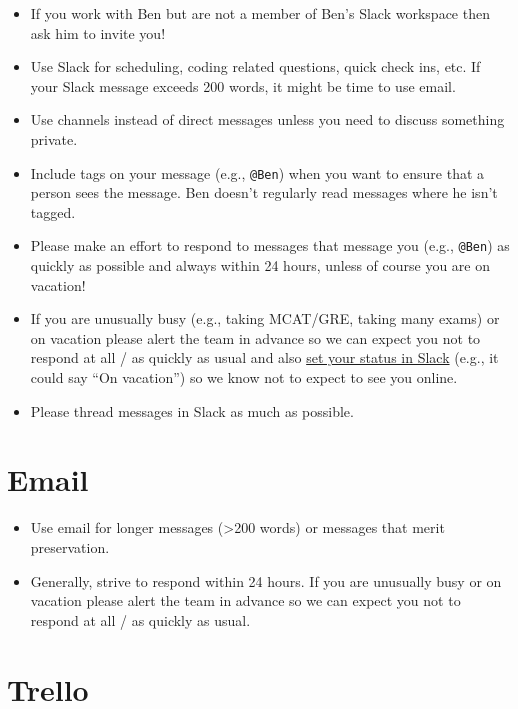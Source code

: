 \documentclass[
]{book}
\providecommand{\tightlist}{%
  \setlength{\itemsep}{0pt}\setlength{\parskip}{0pt}}
\begin{document}
\begin{itemize}
\item
  If you work with Ben but are not a member of Ben's Slack workspace then ask him to invite you!
\item
  Use Slack for scheduling, coding related questions, quick check ins, etc. If your Slack message exceeds 200 words, it might be time to use email.
\item
  Use channels instead of direct messages unless you need to discuss something private.
\item
  Include tags on your message (e.g., \texttt{@Ben}) when you want to ensure that a person sees the message. Ben doesn't regularly read messages where he isn't tagged.
\item
  Please make an effort to respond to messages that message you (e.g., \texttt{@Ben}) as quickly as possible and always within 24 hours, unless of course you are on vacation!
\item
  If you are unusually busy (e.g., taking MCAT/GRE, taking many exams) or on vacation please alert the team in advance so we can expect you not to respond at all / as quickly as usual and also \href{https://get.slack.help/hc/en-us/articles/201864558-Set-your-Slack-status-and-availability}{set your status in Slack} (e.g., it could say ``On vacation'') so we know not to expect to see you online.
\item
  Please thread messages in Slack as much as possible.
\end{itemize}

\hypertarget{email}{%
\section{Email}\label{email}}

\begin{itemize}
\tightlist
\item
  Use email for longer messages (\textgreater200 words) or messages that merit preservation.
\item
  Generally, strive to respond within 24 hours. If you are unusually busy or on vacation please alert the team in advance so we can expect you not to respond at all / as quickly as usual.
\end{itemize}

\hypertarget{trello}{%
\section{Trello}\label{trello}}
\end{document}
